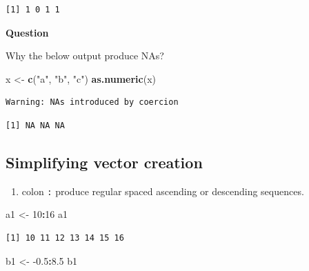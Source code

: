\documentclass[
]{book}
\newenvironment{Shaded}{\begin{snugshade}}{\end{snugshade}}
\newcommand{\DecValTok}[1]{\textcolor[rgb]{0.00,0.00,0.81}{#1}}
\newcommand{\FloatTok}[1]{\textcolor[rgb]{0.00,0.00,0.81}{#1}}
\newcommand{\KeywordTok}[1]{\textcolor[rgb]{0.13,0.29,0.53}{\textbf{#1}}}
\newcommand{\NormalTok}[1]{#1}
\newcommand{\OperatorTok}[1]{\textcolor[rgb]{0.81,0.36,0.00}{\textbf{#1}}}
\newcommand{\StringTok}[1]{\textcolor[rgb]{0.31,0.60,0.02}{#1}}
\providecommand{\tightlist}{%
  \setlength{\itemsep}{0pt}\setlength{\parskip}{0pt}}
\begin{document}
\begin{verbatim}
[1] 1 0 1 1
\end{verbatim}

\textbf{Question}

Why the below output produce NAs?

\begin{Shaded}
\begin{Highlighting}[]
\NormalTok{x <-}\StringTok{ }\KeywordTok{c}\NormalTok{(}\StringTok{"a"}\NormalTok{, }\StringTok{"b"}\NormalTok{, }\StringTok{"c"}\NormalTok{)}
\KeywordTok{as.numeric}\NormalTok{(x)}
\end{Highlighting}
\end{Shaded}

\begin{verbatim}
Warning: NAs introduced by coercion
\end{verbatim}

\begin{verbatim}
[1] NA NA NA
\end{verbatim}

\hypertarget{simplifying-vector-creation}{%
\subsection{Simplifying vector creation}\label{simplifying-vector-creation}}

\begin{enumerate}
\def\labelenumi{\arabic{enumi}.}
\tightlist
\item
  colon \texttt{:} produce regular spaced ascending or descending sequences.
\end{enumerate}

\begin{Shaded}
\begin{Highlighting}[]
\NormalTok{a1 <-}\StringTok{ }\DecValTok{10}\OperatorTok{:}\DecValTok{16}
\NormalTok{a1}
\end{Highlighting}
\end{Shaded}

\begin{verbatim}
[1] 10 11 12 13 14 15 16
\end{verbatim}

\begin{Shaded}
\begin{Highlighting}[]
\NormalTok{b1 <-}\StringTok{ }\FloatTok{-0.5}\OperatorTok{:}\FloatTok{8.5}
\NormalTok{b1}
\end{Highlighting}
\end{Shaded}
\end{document}
